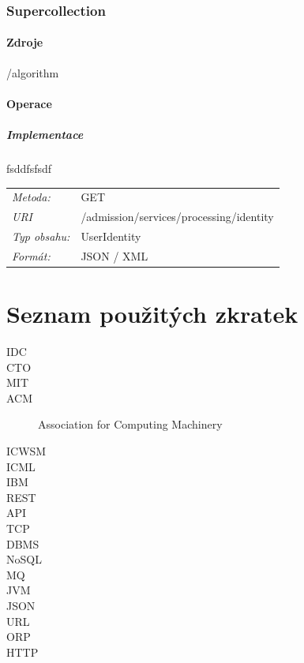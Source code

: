 \documentclass[thesis=M,czech]{FITthesis}[2014/05/07]
\begin{document}
\subsection{Supercollection}

\subsubsection{Zdroje}

\begin{description}
	\item[/algorithm]
	\item[]
	\item[]
\end{description}

\subsubsection{Operace}

\paragraph*{Implementace}

fsddfsfsdf

\begin{center}
 	\begin{tabular}{lp{10cm}}
 		\textit{Metoda:}		& GET			\tabularnewline 
 		\textit{URI}		& /admission/services/processing/identity			\tabularnewline 
 		\textit{Typ obsahu:}		& UserIdentity			\tabularnewline  		
 		\textit{Formát:}		& JSON / XML			\tabularnewline 		
 	\end{tabular}
\end{center} 	


\chapter{Seznam použitých zkratek}
\begin{description}
	\item[IDC] 
	\item[CTO]
	\item[MIT]	
	\item[ACM] Association for Computing Machinery	
	\item[ICWSM]	
	\item[ICML]	
	\item[IBM]	
	\item[REST]	
	\item[API]							
	\item[TCP]
	\item[DBMS]
	\item[NoSQL]
	\item[MQ]
	\item[JVM]
	\item[JSON]
	\item[URL]
	\item[ORP]
	\item[HTTP]
\end{description}
\end{document}

